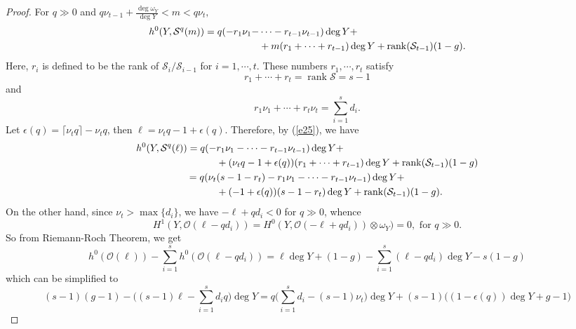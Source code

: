 \documentclass[draft]{amsart}
\theoremstyle{definition}
\numberwithin{equation}{theorem}
\begin{document}
\begin{proof}
For $q\gg0$ and $q\nu_{t-1}+\frac{\deg \omega_Y}{\deg Y} <m < q\nu_t,$
\begin{align}\label{e25}
h^0(Y, {\mathcal{S}}^q(m))=q(-r_1\nu_1- &\cdots - r_{t-1} \nu_{t-1})\deg Y+\\
&+m(r_1+\cdots + r_{t-1})\deg Y+{\mathop{\mathrm{rank}}\nolimits}({\mathcal{S}}_{t-1})(1-g). \notag
\end{align}
Here, $r_i$ is defined to be the rank of ${\mathcal{S}}_i/{\mathcal{S}}_{i-1}$ for $i=1, \cdots, t$. These numbers $r_1, \cdots, r_t$ satisfy
\begin{equation}\label{rank}
r_1+\cdots +r_t={\mathop{\mathrm{rank}}\nolimits} {\mathcal{S}}=s-1
\end{equation}
and
\begin{equation}\label{rankslope}
r_1\nu_1+\cdots +r_t\nu_t=\sum_{i=1}^s d_i.
\end{equation}
Let ${\epsilon(q)}={{\lceil}}\nu_t q{{\rceil}}-\nu_tq$, then ${\ell}=\nu_tq-1+{\epsilon(q)}$. Therefore, by (\ref{e25}), we have
\begin{align}\label{e25l}
h^0(Y, {\mathcal{S}}^q({\ell}))=q(-&r_1\nu_1- \cdots - r_{t-1} \nu_{t-1})\deg Y+\\
&+(\nu_tq-1+{\epsilon(q)})(r_1+\cdots + r_{t-1})\deg Y+{\mathop{\mathrm{rank}}\nolimits}({\mathcal{S}}_{t-1})(1-g) \notag\\
=q(\nu_t&(s-1-r_t)-r_1\nu_1- \cdots - r_{t-1} \nu_{t-1})\deg Y+\notag\\
&+(-1+{\epsilon(q)})(s-1-r_t)\deg Y+{\mathop{\mathrm{rank}}\nolimits}({\mathcal{S}}_{t-1})(1-g). \notag
\end{align}
On the other hand, since $\nu_t>\max\{d_i\}$, we have $-{\ell}+qd_i<0$ for $q\gg0$, whence 
\[H^1(Y, {\mathcal{O}}({\ell}-qd_i))=H^0(Y, {\mathcal{O}}(-{\ell}+qd_i))\otimes \omega_Y)=0, \text{ for }q\gg0.\]
So from Riemann-Roch Theorem, we get
\begin{equation}\label{e26}
h^0({\mathcal{O}}({\ell}))-\sum_{i=1}^s h^0( {\mathcal{O}}({\ell}-qd_i))=
{\ell}\deg Y +(1-g)-\sum_{i=1}^s ({\ell}-qd_i)\deg Y-s(1-g)
\end{equation}
which can be simplified to
\begin{equation}\label{h0}
(s-1)(g-1)-\bigg((s-1){\ell}-\sum_{i=1}^s d_iq\bigg)\deg Y
=q\bigg(\sum_{i=1}^s d_i-(s-1)\nu_t\bigg)\deg Y+(s-1)\bigg((1-{\epsilon(q)})\deg Y +g-1\bigg)
\end{equation}


\end{proof}
\end{document}
